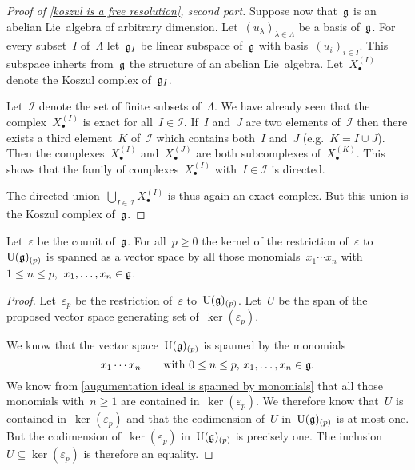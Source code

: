 \begin{proof}[Proof of \cref{koszul is a free resolution}, second part]
  Suppose now that~$\mathfrak{g}$ is an abelian Lie~algebra of arbitrary dimension.
  Let~$(u_\lambda)_{\lambda \in \Lambda}$ be a basis of~$\mathfrak{g}$.
  For every subset~$I$ of~$\Lambda$ let~$\mathfrak{g}_I$ be linear subspace of~$\mathfrak{g}$ with basis~$(u_i)_{i \in I}$.
  This subspace inherts from~$\mathfrak{g}$ the structure of an abelian Lie~algebra.
  Let~$X^{(I)}_\bullet$ denote the Koszul complex of~$\mathfrak{g}_I$.

  Let~$\mathcal{I}$ denote the set of finite subsets of~$\Lambda$.
  We have already seen that the complex~$X^{(I)}_\bullet$ is exact for all~$I \in \mathcal{I}$.
  If~$I$ and~$J$ are two elements of~$\mathcal{I}$ then there exists a third element~$K$ of~$\mathcal{I}$ which contains both~$I$ and~$J$ (e.g.~$K = I \cup J$).
  Then the complexes~$X^{(I)}_\bullet$ and~$X^{(J)}_\bullet$ are both subcomplexes of~$X^{(K)}_\bullet$.
  This shows that the family of complexes~$X^{(I)}_\bullet$ with~$I \in \mathcal{I}$ is directed.

  The directed union~$\bigcup_{I \in \mathcal{I}} X^{(I)}_\bullet$ is thus again an exact complex.
  But this union is the Koszul complex of~$\mathfrak{g}$.
\end{proof}


\begin{lemma}
  \label{kernel of restricted counit}
  Let~$\varepsilon$ be the counit of~$\mathfrak{g}$.
  For all~$p \geq 0$ the kernel of the restriction of~$\varepsilon$ to~$\operatorname{U}(\mathfrak{g})_{(p)}$ is spanned as a vector space by all those monomials~$x_1 \dotsm x_n$ with~$1 \leq n \leq p$,~$x_1, \dotsc, x_n \in \mathfrak{g}$.
\end{lemma}


\begin{proof}
  Let~$\varepsilon_p$ be the restriction of~$\varepsilon$ to~$\operatorname{U}(\mathfrak{g})_{(p)}$.
  Let~$U$ be the span of the proposed vector space generating set of~$\ker(\varepsilon_p)$.

  We know that the vector space~$\operatorname{U}(\mathfrak{g})_{(p)}$ is spanned by the monomials
  \[
    x_1 \dotsm x_n
    \qquad
    \text{with~$0 \leq n \leq p$,~$x_1, \dotsc, x_n \in \mathfrak{g}$.}
  \]
  We know from \cref{augumentation ideal is spanned by monomials} that all those monomials with~$n \geq 1$ are contained in~$\ker(\varepsilon_p)$.
  We therefore know that~$U$ is contained in~$\ker(\varepsilon_p)$ and that the codimension of~$U$ in~$\operatorname{U}(\mathfrak{g})_{(p)}$ is at most one.
  But the codimension of~$\ker(\varepsilon_p)$ in~$\operatorname{U}(\mathfrak{g})_{(p)}$ is precisely one.
  The inclusion~$U \subseteq \ker( \varepsilon_p )$ is therefore an equality.
\end{proof}


